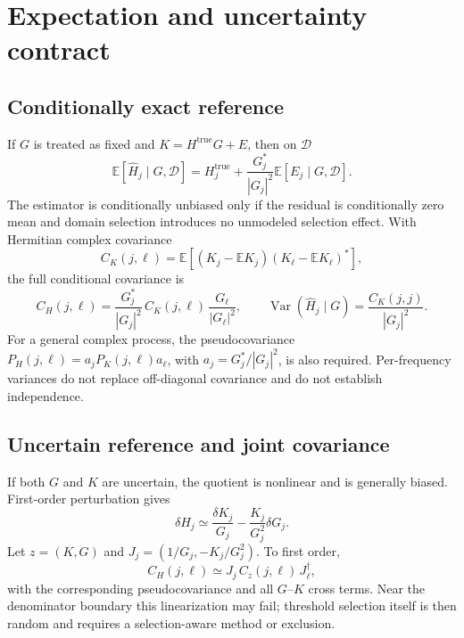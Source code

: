 \documentclass[11pt]{article}
\newcommand{\E}{\mathbb{E}}
\newcommand{\Var}{\operatorname{Var}}
\begin{document}
\section{Expectation and uncertainty contract}

\subsection{Conditionally exact reference}

If $G$ is treated as fixed and
$K=H^{\mathrm{true}}G+E$, then on $\mathcal D$
\[
 \E[\widehat H_{j}\mid G,\mathcal D]
 =H^{\mathrm{true}}_{j}+\frac{G_j^*}{|G_j|^2}\E[E_j\mid G,\mathcal D].
\]
The estimator is conditionally unbiased only if the residual is conditionally
zero mean and domain selection introduces no unmodeled selection effect.  With
Hermitian complex covariance
\[
 C_K(j,\ell)=\E[(K_j-\E K_j)(K_\ell-\E K_\ell)^*],
\]
the full conditional covariance is
\begin{equation}
 C_H(j,\ell)=
 \frac{G_j^*}{|G_j|^2}\,C_K(j,\ell)\,
 \frac{G_\ell}{|G_\ell|^2},
 \qquad
 \Var(\widehat H_j\mid G)=\frac{C_K(j,j)}{|G_j|^2}.
 \label{eq:cov-fixed-g}
\end{equation}
For a general complex process, the pseudocovariance
$P_H(j,\ell)=a_jP_K(j,\ell)a_\ell$, with
$a_j=G_j^*/|G_j|^2$, is also required.  Per-frequency variances do not replace
off-diagonal covariance and do not establish independence.

\subsection{Uncertain reference and joint covariance}

If both $G$ and $K$ are uncertain, the quotient is nonlinear and is generally
biased.  First-order perturbation gives
\[
 \delta H_j\simeq \frac{\delta K_j}{G_j}
 -\frac{K_j}{G_j^2}\delta G_j.
\]
Let $z=(K,G)$ and
$J_j=(1/G_j,-K_j/G_j^2)$.  To first order,
\[
 C_H(j,\ell)\simeq J_j\,C_z(j,\ell)\,J_\ell^\dagger,
\]
with the corresponding pseudocovariance and all $G$--$K$ cross terms.
Near the denominator boundary this linearization may fail; threshold selection
itself is then random and requires a selection-aware method or exclusion.
\end{document}
